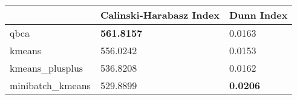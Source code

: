 \begin{table}[htbp]
\centering
\begin{tabular}{lll}
\toprule
 & Calinski-Harabasz Index & Dunn Index \\
\midrule
qbca & \textbf{561.8157} & 0.0163 \\
kmeans & 556.0242 & 0.0153 \\
kmeans_plusplus & 536.8208 & 0.0162 \\
minibatch_kmeans & 529.8899 & \textbf{0.0206} \\
\bottomrule
\end{tabular}
\end{table}
